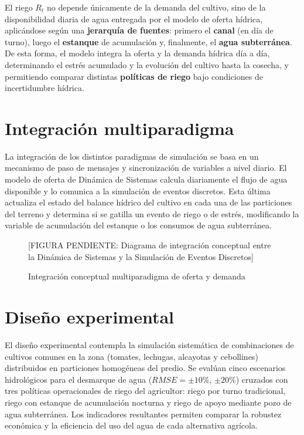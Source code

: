 \documentclass[12pt]{report}
\begin{document}
\vspace{0.2cm}

El riego $R_t$ no depende únicamente de la demanda del cultivo, sino de la disponibilidad diaria de agua entregada por el modelo de oferta hídrica, aplicándose según una \textbf{jerarquía de fuentes}: primero el \textbf{canal} (en día de turno), luego el \textbf{estanque} de acumulación y, finalmente, el \textbf{agua subterránea}. De esta forma, el modelo integra la oferta y la demanda hídrica día a día, determinando el estrés acumulado y la evolución del cultivo hasta la cosecha, y permitiendo comparar distintas \textbf{políticas de riego} bajo condiciones de incertidumbre hídrica.


\section{Integración multiparadigma}

La integración de los distintos paradigmas de simulación se basa en un mecanismo de paso de mensajes y sincronización de variables a nivel diario. El modelo de oferta de Dinámica de Sistemas calcula diariamente el flujo de agua disponible y lo comunica a la simulación de eventos discretos. Esta última actualiza el estado del balance hídrico del cultivo en cada una de las particiones del terreno y determina si se gatilla un evento de riego o de estrés, modificando la variable de acumulación del estanque o los consumos de agua subterránea.

\begin{figure}[H]
    \centering
    \vspace{0.3cm}
    [FIGURA PENDIENTE: Diagrama de integración conceptual entre la Dinámica de Sistemas y la Simulación de Eventos Discretos]
    \caption{Integración conceptual multiparadigma de oferta y demanda}
    \label{fig:integracion_conceptual}
\end{figure}

\section{Diseño experimental}

El diseño experimental contempla la simulación sistemática de combinaciones de cultivos comunes en la zona (tomates, lechugas, alcayotas y cebollines) distribuidos en particiones homogéneas del predio. Se evalúan cinco escenarios hidrológicos para el desmarque de agua ($RMSE = \pm 10\%$, $\pm 20\%$) cruzados con tres políticas operacionales de riego del agricultor: riego por turno tradicional, riego con estanque de acumulación nocturna y riego de apoyo mediante pozo de agua subterránea. Los indicadores resultantes permiten comparar la robustez económica y la eficiencia del uso del agua de cada alternativa agrícola.
\end{document}
